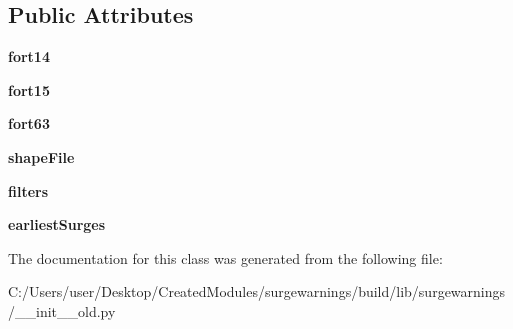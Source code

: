 \subsection*{Public Attributes}
\begin{DoxyCompactItemize}
\item 
\hypertarget{classsurgewarnings_1_1____init____old_1_1_earliest_surge_locator_aea92f6c2fd85f6811e6c06f29206d6c7}{}{\bfseries fort14}\label{classsurgewarnings_1_1____init____old_1_1_earliest_surge_locator_aea92f6c2fd85f6811e6c06f29206d6c7}

\item 
\hypertarget{classsurgewarnings_1_1____init____old_1_1_earliest_surge_locator_a011b755b4f32fb3ceec3d281bf6cfa5e}{}{\bfseries fort15}\label{classsurgewarnings_1_1____init____old_1_1_earliest_surge_locator_a011b755b4f32fb3ceec3d281bf6cfa5e}

\item 
\hypertarget{classsurgewarnings_1_1____init____old_1_1_earliest_surge_locator_a815e2934b2b408a18d53f729cc1760ec}{}{\bfseries fort63}\label{classsurgewarnings_1_1____init____old_1_1_earliest_surge_locator_a815e2934b2b408a18d53f729cc1760ec}

\item 
\hypertarget{classsurgewarnings_1_1____init____old_1_1_earliest_surge_locator_a2893337aab7ed321cecc844973751a50}{}{\bfseries shape\+File}\label{classsurgewarnings_1_1____init____old_1_1_earliest_surge_locator_a2893337aab7ed321cecc844973751a50}

\item 
\hypertarget{classsurgewarnings_1_1____init____old_1_1_earliest_surge_locator_ac9afd3c529517fad344a674b25dfd07b}{}{\bfseries filters}\label{classsurgewarnings_1_1____init____old_1_1_earliest_surge_locator_ac9afd3c529517fad344a674b25dfd07b}

\item 
\hypertarget{classsurgewarnings_1_1____init____old_1_1_earliest_surge_locator_a9317ba690a21e40af6ded98040b76897}{}{\bfseries earliest\+Surges}\label{classsurgewarnings_1_1____init____old_1_1_earliest_surge_locator_a9317ba690a21e40af6ded98040b76897}

\end{DoxyCompactItemize}


The documentation for this class was generated from the following file\+:\begin{DoxyCompactItemize}
\item 
C\+:/\+Users/user/\+Desktop/\+Created\+Modules/surgewarnings/build/lib/surgewarnings/\+\_\+\+\_\+init\+\_\+\+\_\+old.\+py\end{DoxyCompactItemize}
